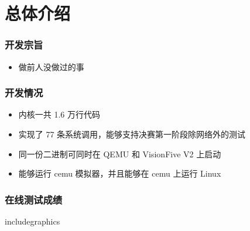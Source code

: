 \section{总体介绍}

\begin{frame}
    \frametitle{开发宗旨}

    \begin{itemize}
        \item 做前人没做过的事
    \end{itemize}

\end{frame}

\begin{frame}
    \frametitle{开发情况}

    \begin{itemize}
        \item 内核一共 1.6 万行代码
        \item 实现了 77 条系统调用，能够支持决赛第一阶段除网络外的测试
        \item 同一份二进制可同时在 QEMU 和 VisionFive V2 上启动
        \item 能够运行 cemu 模拟器，并且能够在 cemu 上运行 Linux
    \end{itemize}

\end{frame}

\begin{frame}
    \frametitle{在线测试成绩}

    includegraphics

\end{frame}
